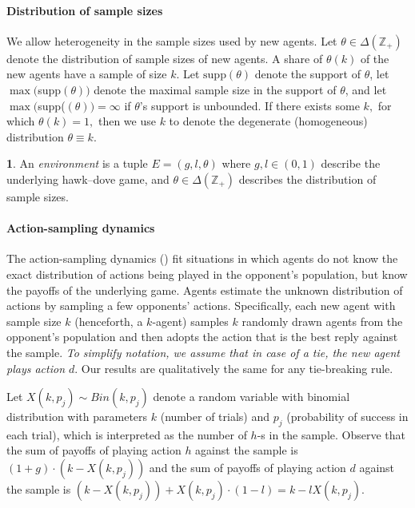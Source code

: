 \documentclass[12pt]{article}
\numberwithin{equation}{section}
\numberwithin{figure}{section}
\theoremstyle{definition}
\newtheorem{defn}{\protect\definitionname}
\theoremstyle{plain}
\theoremstyle{plain}
\theoremstyle{plain}
\theoremstyle{remark}
\theoremstyle{plain}
\theoremstyle{plain}
\providecommand{\definitionname}{Definition}
\def\t{\theta}
\def\D{\Delta}
\begin{document}
\paragraph{Distribution of sample sizes}

We allow heterogeneity in the sample sizes used by new agents. Let
$\theta\in\Delta\left(\mathbb{Z}_{+}\right)$ denote the distribution
of sample sizes of new agents. A share of $\theta\left(k\right)$
of the new agents have a sample of size $k$. Let
$\text{supp}\left(\theta\right)$ denote the support of $\theta$,  let 
$\max($supp$(\theta))$ 
denote the maximal 
sample size in the support of
$\theta$, and let $\max($supp($(\theta))=\infty$ if $\theta$'s
support is unbounded.
If there exists some $k,$ for which $\theta(k)=1,$ then we use
$k$ to denote the degenerate (homogeneous) distribution $\theta\equiv k$.

\begin{defn}
An \emph{environment} is a tuple $E=(g,l,\theta)$ where $g,l\in (0,1)$ describe the underlying hawk--dove game, and $\t\in\D\left(\mathbb{Z}_{+}\right)$ describes the distribution of sample sizes. 
\end{defn}


\paragraph{Action-sampling dynamics}
The action-sampling dynamics (\citealp{sandholm2001almost}) fit situations in which agents do not know the exact distribution of actions being played in the opponent's population, but know the payoffs of the underlying game. Agents estimate the unknown distribution of actions by sampling a few opponents' actions. Specifically, each new agent with sample size $k$ (henceforth, a $k$-agent) samples
$k$ randomly drawn agents from the opponent's population and then adopts the action that is the best reply  against the sample. 
\emph{To simplify notation, we assume that in case of a tie, the new agent plays action $d$}. Our results are
qualitatively the same for any tie-breaking rule.

Let ${X}(k,p_{j})\sim Bin\left(k,p_{j}\right)$
denote a random variable with binomial distribution with parameters
$k$ (number of trials) and $p_{j}$ (probability of success in each
trial), which is interpreted as the number of $h$-s in the sample. 
Observe that the sum of payoffs of playing action $h$ against the sample is $(1+g)\cdot(k-X(k,p_j))$ and the sum of payoffs of playing action $d$ against the sample is
$(k-X(k,p_j))+X(k,p_j)\cdot(1-l)=k-lX(k,p_j)$. 
\end{document}
